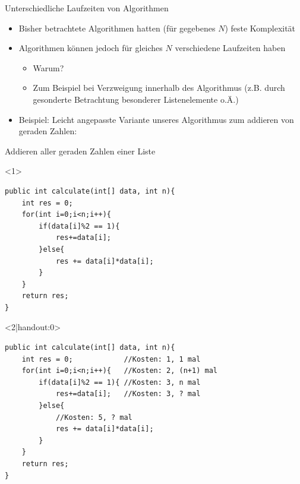 \begin{frame}{Unterschiedliche Laufzeiten von Algorithmen}
    \begin{itemize}[<+->]
        \item Bisher betrachtete Algorithmen hatten (für gegebenes $N$) feste Komplexität
        \item Algorithmen können jedoch für gleiches $N$ verschiedene Laufzeiten haben
        \begin{itemize}
            \item Warum?
            \item<handout:0> Zum Beispiel bei Verzweigung innerhalb des Algorithmus (z.B. durch gesonderte Betrachtung besonderer Listenelemente o.Ä.)
        \end{itemize}
        \item Beispiel: Leicht angepasste Variante unseres Algorithmus zum addieren von geraden Zahlen:
    \end{itemize}
\end{frame}

\begin{frame}[fragile]{Addieren aller geraden Zahlen einer Liste}
\lstset{style=java}
\begin{onlyenv}<1>
\begin{lstlisting}
public int calculate(int[] data, int n){
    int res = 0;
    for(int i=0;i<n;i++){
        if(data[i]%2 == 1){
            res+=data[i];
        }else{
            res += data[i]*data[i];
        }
    }
    return res;
}
\end{lstlisting}
\end{onlyenv}
\begin{onlyenv}<2|handout:0>
\begin{lstlisting}
public int calculate(int[] data, int n){
    int res = 0;            //Kosten: 1, 1 mal
    for(int i=0;i<n;i++){   //Kosten: 2, (n+1) mal
        if(data[i]%2 == 1){ //Kosten: 3, n mal
            res+=data[i];   //Kosten: 3, ? mal
        }else{
            //Kosten: 5, ? mal
            res += data[i]*data[i];
        }
    }
    return res;
}
\end{lstlisting}
\end{onlyenv}
\end{frame}

